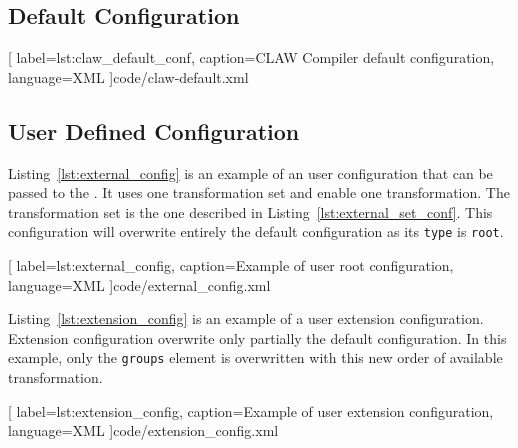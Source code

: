 \subsection{Default Configuration}

  [
    label=lst:claw_default_conf,
    caption=CLAW Compiler default configuration,
    language=XML
  ]{code/claw-default.xml}

\subsection{User Defined Configuration}
Listing~\ref{lst:external_config} is an example of an user configuration that
can be passed to the \clawfcomp. It uses one transformation set and enable
one transformation. The transformation set is the one described in 
Listing~\ref{lst:external_set_conf}. This configuration will overwrite 
entirely the default configuration as its \lstinline!type! is \lstinline!root!.


  [
    label=lst:external_config,
    caption=Example of user root configuration,
    language=XML
  ]{code/external_config.xml}

Listing~\ref{lst:extension_config} is an example of a user extension 
configuration. Extension configuration overwrite only partially the default 
configuration. In this example, only the \lstinline!groups! element is 
overwritten with this new order of available transformation.


  [
    label=lst:extension_config,
    caption=Example of user extension configuration,
    language=XML
  ]{code/extension_config.xml}